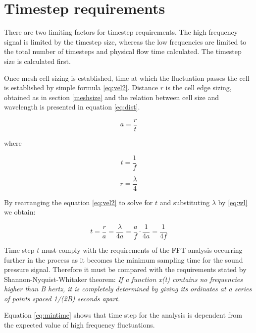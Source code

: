 \section{Timestep requirements} \label{timestepsize}
There are two limiting factors for timestep requirements. The high frequency signal is limited by the timestep size, whereas the low frequencies are limited to the total number of timesteps and physical flow time calculated. The timestep size is calculated first.

Once mesh cell sizing is established, time at which the fluctuation passes the cell is established by simple formula \ref{eq:vel2}. Distance $r$ is the cell edge sizing, obtained as in section \ref{meshsize} and the relation between cell size and wavelength is presented in equation \ref{eq:dist}.

\begin{equation} \label{eq:vel2}
a = \frac{r}{t}
\end{equation}

\noindent where

\begin{equation} \label{eq:time}
t = \frac{1}{f}
\end{equation}

\begin{equation} \label{eq:dist}
r = \frac{\lambda}{4}
\end{equation}

By rearranging the equation \ref{eq:vel2} to solve for $t$ and substituting $\lambda$ by \ref{eq:wl} we obtain:

\begin{equation} \label{eq:mintime}
t = \frac{r}{a} = \frac{\lambda}{4a} = \frac{a}{f} \cdot \frac{1}{4a} = \frac{1}{4f}
\end{equation}

Time step $t$ must comply with the requirements of the FFT analysis occurring further in the process as it becomes the minimum sampling time for the sound pressure signal. Therefore it must be compared with the requirements stated by Shannon-Nyquist-Whitaker theorem: \textit{If a function x(t) contains no frequencies higher than B hertz, it is completely determined by giving its ordinates at a series of points spaced 1/(2B) seconds apart.}

Equation \ref{eq:mintime} shows that time step for the analysis is dependent from the expected value of high frequency fluctuations. %


